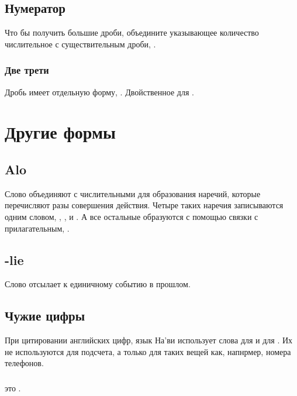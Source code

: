 \subsection{Нумератор} Что бы получить большие дроби, объедините указывающее ко\-ли\-че\-ство числительное с существительным дроби,   .

\subsubsection{Две трети} Дробь  имеет отдельную форму, . Двойственное для . 


\section{Другие формы}

\subsection{Alo} Слово   объединяют с числительными для образования наречий, которые перечисляют разы совершения действия. Четыре таких наречия записываются одним словом,
 ,  , 
 и  .
А все остальные образуются с помощью связки с прилагательным,  . 

\subsection{-lie} Слово   отсылает к единичному событию в прошлом. 

\subsection{Чужие цифры} При цитировании английских цифр, язык На'ви использует слова
 для  и  для . Их не используются для подсчета, а только для таких вещей как, напнрмер, номера телефонов.

\subsubsection{}  это .  
